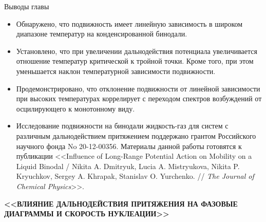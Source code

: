 \documentclass{beamer}
\begin{document}
\begin{frame}{Выводы главы}
\footnotesize{
\begin{itemize}

    \item Обнаружено, что подвижность имеет линейную зависимость в широком диапазоне температур на конденсированной бинодали.

    \item Установлено, что при увеличении дальнодействия потенциала увеличивается отношение температур критической к тройной точки. Кроме того, при этом уменьшается наклон температурной зависимости подвижности.

    \item Продемонстрировано, что отклонение подвижности от линейной зависимости при высоких температурах коррелирует с переходом спектров возбуждений от осцилирующего к монотонному виду.

    \item Исследование подвижности на бинодали жидкость-газ для систем с различным дальнодействием притяжением поддержано грантом Российского научного фонда No 20-12-00356. Материалы данной работы готовятся к публикации <<Influence of Long-Range Potential Action on Mobility on a Liquid Binodal / Nikita A. Dmitryuk, Lucia A. Mistryukova, Nikita P. Kryuchkov, Sergey A. Khrapak, Stanislav O. Yurchenko. // \textit{The Journal of Chemical Physics}>>.
\end{itemize}

}
\end{frame}









\begin{frame}
\begin{center}
\vspace{5mm}
\textbf{<<ВЛИЯНИЕ ДАЛЬНОДЕЙСТВИЯ ПРИТЯЖЕНИЯ НА ФАЗОВЫЕ ДИАГРАММЫ И СКОРОСТЬ НУКЛЕАЦИИ>>}
\end{center}
\end{frame}
\end{document}
